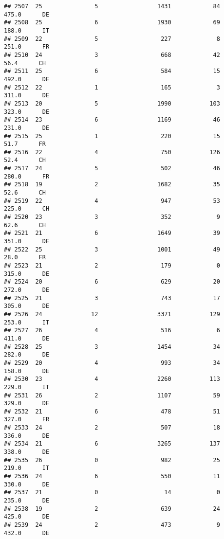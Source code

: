 \documentclass[
]{article}
\begin{document}
\begin{verbatim}
## 2507  25               5                 1431            84    475.0      DE
## 2508  25               6                 1930            69    188.0      IT
## 2509  22               5                  227             8    251.0      FR
## 2510  24               3                  668            42     56.4      CH
## 2511  25               6                  584            15    492.0      DE
## 2512  22               1                  165             3    311.0      DE
## 2513  20               5                 1990           103    323.0      DE
## 2514  23               6                 1169            46    231.0      DE
## 2515  25               1                  220            15     51.7      FR
## 2516  22               4                  750           126     52.4      CH
## 2517  24               5                  502            46    280.0      FR
## 2518  19               2                 1682            35     52.6      CH
## 2519  22               4                  947            53    225.0      CH
## 2520  23               3                  352             9     62.6      CH
## 2521  21               6                 1649            39    351.0      DE
## 2522  25               3                 1001            49     28.0      FR
## 2523  21               2                  179             0    315.0      DE
## 2524  20               6                  629            20    272.0      DE
## 2525  21               3                  743            17    305.0      DE
## 2526  24              12                 3371           129    253.0      IT
## 2527  26               4                  516             6    411.0      DE
## 2528  25               3                 1454            34    282.0      DE
## 2529  20               4                  993            34    158.0      DE
## 2530  23               4                 2260           113    229.0      IT
## 2531  26               2                 1107            59    329.0      DE
## 2532  21               6                  478            51    327.0      FR
## 2533  24               2                  507            18    336.0      DE
## 2534  21               6                 3265           137    338.0      DE
## 2535  26               0                  982            25    219.0      IT
## 2536  24               6                  550            11    330.0      DE
## 2537  21               0                   14             0    235.0      DE
## 2538  19               2                  639            24    425.0      DE
## 2539  24               2                  473             9    432.0      DE

\end{verbatim}
\end{document}
